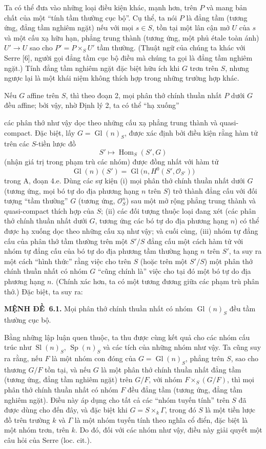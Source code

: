 \documentclass[11pt,twoside,openany]{book}
\numberwithin{equation}{section}
\newcommand{\src}[1]{%
  \phantomsection\hypertarget{src:\fgasourceid:#1}{}%
  \marginpar{\raggedleft\footnotesize\sffamily #1}%
}
\newcommand{\fgasourceid}{unset}
\newcommand{\result}[2]{\par\medskip\noindent\textbf{#1\if\relax\detokenize{#2}\relax\else\ #2\fi.}\quad}
\begin{document}
Ta có thể đưa vào những loại điều kiện khác, mạnh hơn, trên $P$ và mang bản chất
của một ``tính tầm thường cục bộ''. Cụ thể, ta nói $P$ là đẳng tầm
(tương ứng, đẳng tầm nghiêm ngặt) nếu với mọi $s\in S$, tồn tại một lân
cận mở $U$ của $s$ và một cấu xạ hữu hạn, phẳng trung thành (tương ứng, một phủ
étale toàn ánh) $U'\longrightarrow U$ sao cho $P'=P\times_SU'$ tầm thường.
(Thuật ngữ của chúng ta khác với Serre [6], người gọi đẳng tầm cục bộ
điều mà chúng ta gọi là đẳng tầm nghiêm ngặt.) Tính đẳng tầm nghiêm ngặt
đặc biệt hữu ích khi $G$ trơn trên $S$, nhưng ngược lại là một khái niệm không
thích hợp trong những trường hợp khác.

Nếu $G$ affine trên $S$, thì theo đoạn 2, mọi phân thớ chính thuần nhất $P$ dưới
$G$ đều affine; bởi vậy, nhờ Định lý 2, ta có thể ``hạ xuống''

\src{326}
các phân thớ như vậy dọc theo những cấu xạ phẳng trung thành và quasi-compact.
Đặc biệt, lấy $G=\operatorname{Gl}(n)_S$, được xác định bởi điều kiện rằng hàm
tử trên các $S$-tiền lược đồ
\[
  S'\longmapsto\operatorname{Hom}_S(S',G)
\]
(nhận giá trị trong phạm trù các nhóm) được đồng nhất với hàm tử
\[
  \operatorname{Gl}(n)(S')
  =\operatorname{Gl}\bigl(n,H^0(S',\mathcal O_{S'})\bigr)
\]
trong A, đoạn 4.e. Dùng các sự kiện (i) mọi phân thớ chính thuần nhất dưới $G$
(tương ứng, mọi bó tự do địa phương hạng $n$ trên $S$) trở thành đẳng cấu với
đối tượng ``tầm thường'' $G$ (tương ứng, $\mathcal O_S^n$) sau một mở rộng
phẳng trung thành và quasi-compact thích hợp của $S$; (ii) các đối tượng thuộc
loại đang xét (các phân thớ chính thuần nhất dưới $G$, tương ứng các bó tự do
địa phương hạng $n$) có thể được hạ xuống dọc theo những cấu xạ như vậy; và
cuối cùng, (iii) nhóm tự đẳng cấu của phân thớ tầm thường trên một $S'/S$ đẳng
cấu một cách hàm tử với nhóm tự đẳng cấu của bó tự do địa phương tầm thường
hạng $n$ trên $S'$, ta suy ra một cách ``hình thức'' rằng việc cho trên $S$
(hoặc trên một $S'/S$) một phân thớ chính thuần nhất có nhóm $G$ ``cũng chính
là'' việc cho tại đó một bó tự do địa phương hạng $n$. (Chính xác hơn, ta có
một tương đương giữa các phạm trù phân thớ.) Đặc biệt, ta suy ra:

\result{MỆNH ĐỀ}{6.1} Mọi phân thớ chính thuần nhất có nhóm
$\operatorname{Gl}(n)_S$ đều tầm thường cục bộ.

Bằng những lập luận quen thuộc, ta thu được cùng kết quả cho các nhóm cấu trúc
như $\operatorname{Sl}(n)_S$, $\operatorname{Sp}(n)_S$ và các tích của những
nhóm như vậy. Ta cũng suy ra rằng, nếu $F$ là một nhóm con đóng của
$G=\operatorname{Gl}(n)_S$, phẳng trên $S$, sao cho thương $G/F$ tồn tại, và
nếu $G$ là một phân thớ chính thuần nhất đẳng tầm (tương ứng, đẳng tầm nghiêm
ngặt) trên $G/F$, với nhóm $F\times_S(G/F)$, thì mọi phân thớ chính thuần nhất
có nhóm $F$ đều đẳng tầm (tương ứng, đẳng tầm nghiêm ngặt). Điều này áp dụng
cho tất cả các ``nhóm tuyến tính'' trên $S$ đã được dùng cho đến đây, và đặc
biệt khi $G=S\times_k\Gamma$, trong đó $S$ là một tiền lược đồ trên trường $k$
và $\Gamma$ là một nhóm tuyến tính theo nghĩa cổ điển, đặc biệt là một nhóm
trơn, trên $k$. Do đó, đối với các nhóm như vậy, điều này giải quyết một câu hỏi
của Serre (loc. cit.).
\end{document}
